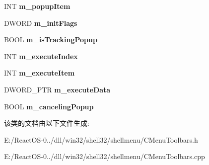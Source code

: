 \begin{DoxyCompactItemize}
\mbox{\label{class_c_menu_toolbar_base_a92d2c5b4ddfd255a159871b76e620971}} 
I\+NT {\bfseries m\+\_\+popup\+Item}
\item 
\mbox{\label{class_c_menu_toolbar_base_a9275cc9f06c7fae2665723ac8e59c9fc}} 
D\+W\+O\+RD {\bfseries m\+\_\+init\+Flags}
\item 
\mbox{\label{class_c_menu_toolbar_base_af90135b935614fb5a5420bf4dfedbdf7}} 
B\+O\+OL {\bfseries m\+\_\+is\+Tracking\+Popup}
\item 
\mbox{\label{class_c_menu_toolbar_base_ac816905acce677e4fd1ea7ed46c24da8}} 
I\+NT {\bfseries m\+\_\+execute\+Index}
\item 
\mbox{\label{class_c_menu_toolbar_base_a13bd131dc58746f5a19636d144041f1c}} 
I\+NT {\bfseries m\+\_\+execute\+Item}
\item 
\mbox{\label{class_c_menu_toolbar_base_a19ae7038aceeee704589dd81b2570900}} 
D\+W\+O\+R\+D\+\_\+\+P\+TR {\bfseries m\+\_\+execute\+Data}
\item 
\mbox{\label{class_c_menu_toolbar_base_ae86406bfafe651f8b3a319b6d384942f}} 
B\+O\+OL {\bfseries m\+\_\+canceling\+Popup}
\end{DoxyCompactItemize}


该类的文档由以下文件生成\+:\begin{DoxyCompactItemize}
\item 
E\+:/\+React\+O\+S-\/0../dll/win32/shell32/shellmenu/C\+Menu\+Toolbars.\+h\item 
E\+:/\+React\+O\+S-\/0../dll/win32/shell32/shellmenu/C\+Menu\+Toolbars.\+cpp\end{DoxyCompactItemize}
